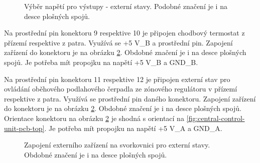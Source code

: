 \begin{Czech}
\begin{figure}[H]
    \centering
    \def\svgwidth{0.25\columnwidth}
    \graphicspath{{pictures/all/hardware/svg/}}
    
    \caption{Výběr napětí pro výstupy - externí stavy. Podobné značení je i na desce plošných spojů.}
    \label{fig:pin-header-external-states}
\end{figure}
\end{Czech}

\begin{Czech}
\end{Czech}

\begin{Czech}
Na prostřední pin konektoru 9 respektive 10 je připojen chodbový termostat z přízemí respektive z patra. Využívá se +5 V\_B a prostřední pin. Zapojení zařízení do konektoru je na obrázku \ref{fig:terminal-block-external-state}. Obdobné značení je i na desce plošných spojů. Je potřeba mít propojku na napětí +5 V\_B a  GND\_B.
\end{Czech}

\begin{Czech}
\end{Czech}

\begin{Czech}
Na prostřední pin konektoru 11 respektive 12 je připojen externí stav pro ovládání oběhového podlahového čerpadla ze zónového regulátoru v přízemí respektive z patra. Využívá se prostřední pin daného konektoru. Zapojení zařízení do konektoru je na obrázku \ref{fig:terminal-block-external-state}. Obdobné značení je i na desce plošných spojů. Orientace konektoru na obrázku \ref{fig:terminal-block-external-state} je shodná s orientací na \ref{fig:central-control-unit-pcb-top}. Je potřeba mít propojku na napětí +5 V\_A a  GND\_A.
\end{Czech}

\begin{Czech}
\begin{figure}[H]
    \centering
    \def\svgwidth{0.15\columnwidth}
    \graphicspath{{pictures/all/hardware/svg/}}
    
    \caption{Zapojení externího zařízení na svorkovnici pro externí stavy. Obdobné značení je i na desce plošných spojů.}
    \label{fig:terminal-block-external-state}
\end{figure}
\end{Czech}

